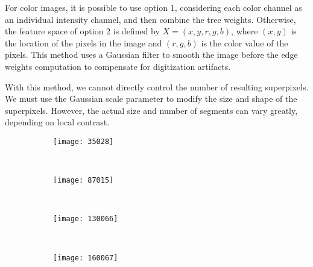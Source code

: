 For color images, it is possible to use option 1, considering each color channel as an individual intensity channel, and then combine the tree weights. Otherwise, the feature space of option 2 is defined by $X = (x, y,r, g, b)$, where $(x, y)$ is the location of the pixels in the image and $(r, g, b)$ is the color value of the pixels. This method uses a Gaussian filter to smooth the image before the edge weights computation to compensate for digitization artifacts. 

With this method, we cannot directly control the number of resulting superpixels. We must use the Gaussian scale parameter to modify the size and shape of the superpixels. However, the actual size and number of segments can vary greatly, depending on local contrast.

\begin{figure}[!ht]
    \centering
    \begin{subfigure}[t]{\textwidth+20pt\relax}
    	\texttt{[image: 35028]} 
    \end{subfigure}      
    ~ %
    \begin{subfigure}[b]{0.2\textwidth}
        \texttt{[image: 87015]}
    \end{subfigure}
    ~ %
    \begin{subfigure}[b]{0.2\textwidth}
        \texttt{[image: 130066]}
    \end{subfigure}
    ~ %
    \begin{subfigure}[b]{0.2\textwidth}
        \texttt{[image: 160067]}
    \end{subfigure} \\[2ex]       
    

\end{figure}
